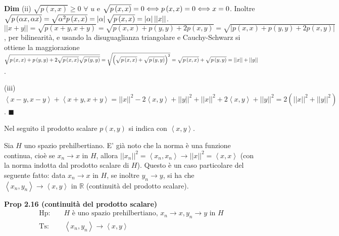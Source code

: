 \documentclass{article}
\begin{document}
\textbf{Dim} (ii) $\sqrt{p\left( x,x\right) }\geq 0$ $\forall $ $u$ e $\sqrt{%
p\left( x,x\right) }=0\Longleftrightarrow p\left( x,x\right)
=0\Longleftrightarrow x=0$. Inoltre $\sqrt{p\left( \alpha x,\alpha x\right) }%
=\sqrt{\alpha ^{2}p\left( x,x\right) }=\left\vert \alpha \right\vert \sqrt{%
p\left( x,x\right) }=\left\vert \alpha \right\vert \left\vert \left\vert
x\right\vert \right\vert $. $\left\vert \left\vert x+y\right\vert
\right\vert =\sqrt{p\left( x+y,x+y\right) }=\sqrt{p\left( x,x\right)
+p\left( y,y\right) +2p\left( x,y\right) }=\sqrt{\left\vert p\left(
x,x\right) +p\left( y,y\right) +2p\left( x,y\right) \right\vert }$, per
bilinearit\`{a}, e usando la disuguaglianza triangolare e Cauchy-Schwarz si
ottiene la maggiorazione $\sqrt{p\left( x,x\right) +p\left( y,y\right) +2%
\sqrt{p\left( x,x\right) }\sqrt{p\left( y,y\right) }}=\sqrt{\left( \sqrt{%
p\left( x,x\right) }+\sqrt{p\left( y,y\right) }\right) ^{2}}=\sqrt{p\left(
x,x\right) }+\sqrt{p\left( y,y\right) }=\left\vert \left\vert x\right\vert
\right\vert +\left\vert \left\vert y\right\vert \right\vert $.

(iii) $\left\langle x-y,x-y\right\rangle +\left\langle x+y,x+y\right\rangle
=\left\vert \left\vert x\right\vert \right\vert ^{2}-2\left\langle
x,y\right\rangle +\left\vert \left\vert y\right\vert \right\vert
^{2}+\left\vert \left\vert x\right\vert \right\vert ^{2}+2\left\langle
x,y\right\rangle +\left\vert \left\vert y\right\vert \right\vert
^{2}=2\left( \left\vert \left\vert x\right\vert \right\vert ^{2}+\left\vert
\left\vert y\right\vert \right\vert ^{2}\right) $. $\blacksquare $

Nel seguito il prodotto scalare $p\left( x,y\right) $ si indica con $%
\left\langle x,y\right\rangle $.

Sia $H$ uno spazio prehilbertiano. E' gi\`{a} noto che la norma \`{e} una
funzione continua, cio\`{e} se $x_{n}\rightarrow x$ in $H$, allora $%
\left\vert \left\vert x_{n}\right\vert \right\vert ^{2}=\left\langle
x_{n},x_{n}\right\rangle \rightarrow \left\vert \left\vert x\right\vert
\right\vert ^{2}=\left\langle x,x\right\rangle $ (con la norma indotta dal
prodotto scalare di $H$). Questo \`{e} un caso particolare del seguente
fatto: data $x_{n}\rightarrow x$ in $H$, se inoltre $y_{n}\rightarrow y$, si
ha che $\left\langle x_{n},y_{n}\right\rangle \rightarrow \left\langle
x,y\right\rangle $ in $%
\mathbb{R}
$ (continuit\`{a} del prodotto scalare).

\textbf{Prop 2.16 (continuit\`{a} del prodotto scalare)}%
\begin{eqnarray*}
\text{Hp}\text{: } &&H\text{ \`{e} uno spazio prehilbertiano, }%
x_{n}\rightarrow x,y_{n}\rightarrow y\text{ in }H \\
\text{Ts}\text{: } &&\left\langle x_{n},y_{n}\right\rangle \rightarrow
\left\langle x,y\right\rangle
\end{eqnarray*}
\end{document}
